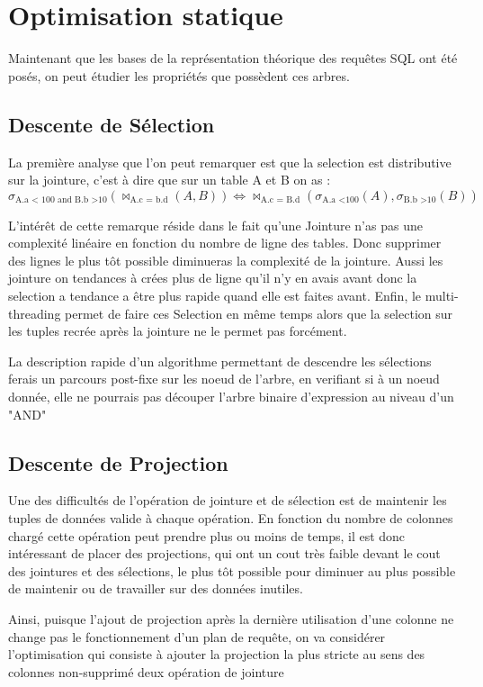 \documentclass[12pt,a4paper]{article}
\newcommand{\paren}[1]{\left(#1\right)} %
\begin{document}
\section{Optimisation statique}
Maintenant que les bases de la représentation théorique des requêtes SQL ont été posés, on peut étudier les propriétés que possèdent ces arbres.
\subsection{Descente de Sélection}
La première analyse que l'on peut remarquer est que la selection est distributive sur la jointure, c'est à dire que sur un table A et B on as :
\[\sigma_{\text{A.a < 100 and B.b >10}} \paren{\Join_{\text{A.c = b.d}}\paren{A,B}} \Longleftrightarrow \Join_{\text{A.c = B.d}} \paren{\sigma_{\text{A.a <100}}\paren{A}, \sigma_{\text{B.b >10}}\paren{B}}\]

L'intérêt de cette remarque réside dans le fait qu'une Jointure n'as pas une complexité linéaire en fonction du nombre de ligne des tables. Donc supprimer des lignes le plus tôt possible diminueras la complexité de la jointure. Aussi les jointure on tendances à crées plus de ligne qu'il n'y en avais avant donc la selection a tendance a être plus rapide quand elle est faites avant. Enfin, le multi-threading permet de faire ces Selection en même temps alors que la selection sur les tuples recrée après la jointure ne le permet pas forcément.


La description rapide d'un algorithme permettant de descendre les sélections ferais un parcours post-fixe sur les noeud de l'arbre, en verifiant si à un noeud donnée, elle ne pourrais pas découper l'arbre binaire d'expression au niveau d'un "AND"
\subsection{Descente de Projection}
Une des difficultés de l'opération de jointure et de sélection est de maintenir les tuples de données valide à chaque opération. En fonction du nombre de colonnes chargé cette opération peut prendre plus ou moins de temps, il est donc intéressant de placer des projections, qui ont un cout très faible devant le cout des jointures et des sélections, le plus tôt possible pour diminuer au plus possible de maintenir ou de travailler sur des données inutiles.

Ainsi, puisque l'ajout de projection après la dernière utilisation d'une colonne ne change pas le fonctionnement d'un plan de requête, on va considérer l'optimisation qui consiste à ajouter la projection la plus stricte au sens des colonnes non-supprimé deux opération de jointure
\end{document}
